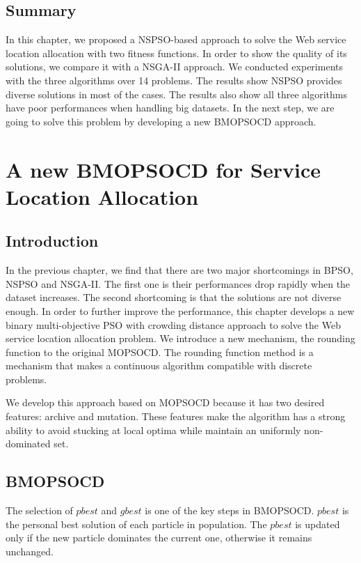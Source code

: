 \section{Summary}
In this chapter, we proposed a  NSPSO-based approach to solve the Web service location allocation with two fitness functions.
In order to show the quality of its solutions, we compare it with a NSGA-II approach.
We conducted experiments with the three algorithms over 14 problems.
The results show NSPSO provides diverse solutions in most of the cases. 
The results also show all three algorithms have poor performances when handling big datasets. 
In the next step, we are going to solve this problem by developing a new BMOPSOCD approach.

\chapter{A new BMOPSOCD for Service Location Allocation}
\label{C:bmopsocd}
\section{Introduction}
In the previous chapter, we find that there are two major shortcomings in BPSO, NSPSO and NSGA-II. The first one is
their performances drop rapidly when the dataset increases. The second shortcoming is that 
the solutions are not diverse enough. In order to further improve the performance, 
this chapter develops a new binary multi-objective PSO with crowding distance approach to solve the Web service location allocation problem. 
We introduce a new mechanism, the rounding function to the original MOPSOCD. The rounding function method is a mechanism
that makes a continuous algorithm compatible with discrete problems. 

We develop this approach based on MOPSOCD \cite{Raquel} because it has two desired features: archive and mutation. These features make the algorithm has a strong ability to avoid stucking at local optima while maintain an 
uniformly non-dominated set. 



\section{BMOPSOCD}
The selection of $pbest$ and $gbest$ is one of the key steps in BMOPSOCD.
$pbest$ is the personal best solution of each particle in population. The $pbest$ is updated only if the new particle dominates the current one, otherwise it remains unchanged.

